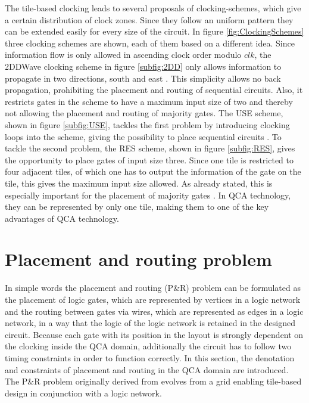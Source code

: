 The tile-based clocking leads to several proposals of clocking-schemes, which give a certain distribution of clock zones. Since they follow an uniform pattern they can be extended easily for every size of the circuit. In figure \ref{fig:ClockingSchemes} three clocking schemes are shown, each of them based on a different idea. Since information flow is only allowed in ascending clock order modulo $clk$, the 2DDWave clocking scheme in figure \ref{subfig:2DD} only allows information to propagate in two directions, south and east \cite{2DD}. This simplicity allows no back propagation, prohibiting the placement and routing of sequential circuits. Also, it restricts gates in the scheme to have a maximum input size of two and thereby not allowing the placement and routing of majority gates. The USE scheme, shown in figure \ref{subfig:USE}, tackles the first problem by introducing clocking loops into the scheme, giving the possibility to place sequential circuits \cite{USE}. To tackle the second problem, the RES scheme, shown in figure \ref{subfig:RES}, gives the opportunity to place gates of input size three. Since one tile is restricted to four adjacent tiles, of which one has to output the information of the gate on the tile, this gives the maximum input size allowed. As already stated, this is especially important for the placement of majority gates \cite{RES}. In QCA technology, they can be represented by only one tile, making them to one of the key advantages of QCA technology.

\section{Placement and routing problem} \label{sec:PR}

In simple words the placement and routing (P\&R) problem can be formulated as the placement of logic gates, which are represented by vertices in a logic network and the routing between gates via wires, which are represented as edges in a logic network, in a way that the logic of the logic network is retained in the designed circuit. Because each gate with its position in the layout is strongly dependent on the clocking inside the QCA domain, additionally the circuit has to follow two timing constraints in order to function correctly. In this section, the denotation and constraints of placement and routing in the QCA domain are introduced. The P\&R problem originally derived from \cite{Walter} evolves from a grid enabling tile-based design in conjunction with a logic network.

